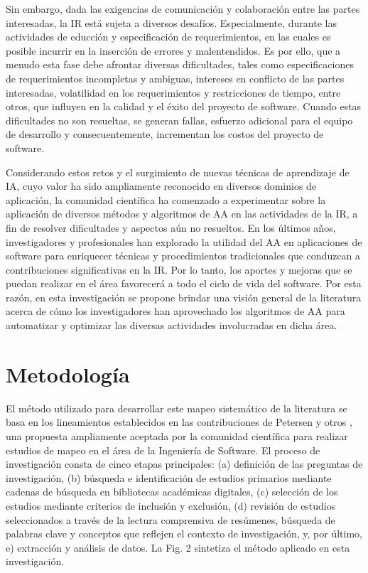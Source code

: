 \documentclass[journal]{IEEEtran}
\begin{document}
Sin embargo, dada las exigencias de comunicación y colaboración entre las partes interesadas, la IR está sujeta a diversos desafíos. Especialmente, durante las actividades de educción y especificación de requerimientos, en las cuales es posible incurrir en la inserción de errores y malentendidos. Es por ello, que a menudo esta fase debe afrontar diversas dificultades, tales como especificaciones de requerimientos incompletas y ambiguas, intereses en conflicto de las partes interesadas, volatilidad en los requerimientos y restricciones de tiempo, entre otros, que influyen en la calidad y el éxito del proyecto de software. Cuando estas dificultades no son resueltas, se generan fallas, esfuerzo adicional para el equipo de desarrollo y consecuentemente, incrementan los costos del proyecto de software. 

Considerando estos retos y el surgimiento de nuevas técnicas de aprendizaje de IA, cuyo valor ha sido ampliamente reconocido en diversos dominios de aplicación, la comunidad científica ha comenzado a experimentar sobre la aplicación de diversos métodos y algoritmos de AA en las actividades de la IR, a fin de resolver dificultades y aspectos aún no resueltos. En los últimos años, investigadores y profesionales han explorado la utilidad del AA en aplicaciones de software para enriquecer técnicas y procedimientos tradicionales que conduzcan a contribuciones significativas en la IR. Por lo tanto, los aportes y mejoras que se puedan realizar en el área favorecerá a todo el ciclo de vida del software. Por esta razón, en esta investigación se propone brindar una visión general de la literatura acerca de cómo los investigadores han aprovechado los algoritmos de AA para automatizar y optimizar las diversas actividades involucradas en dicha área.



\section{Metodología}

El método utilizado para desarrollar este mapeo sistemático de la literatura se basa en los lineamientos establecidos en las contribuciones de Petersen y otros \cite{petersen2008systematic}, una propuesta ampliamente aceptada por la comunidad científica para realizar estudios de mapeo en el área de la Ingeniería de Software. El proceso de investigación consta de cinco etapas principales: (a) definición de las preguntas de investigación, (b) búsqueda e identificación de estudios primarios mediante cadenas de búsqueda en bibliotecas académicas digitales, (c) selección de los estudios mediante criterios de inclusión y exclusión, (d) revisión de estudios seleccionados a través de la lectura comprensiva de resúmenes, búsqueda de palabras clave y conceptos que reflejen el contexto de investigación, y, por último, e) extracción y análisis de datos. La Fig. 2 sintetiza el método aplicado en esta investigación.
\end{document}
